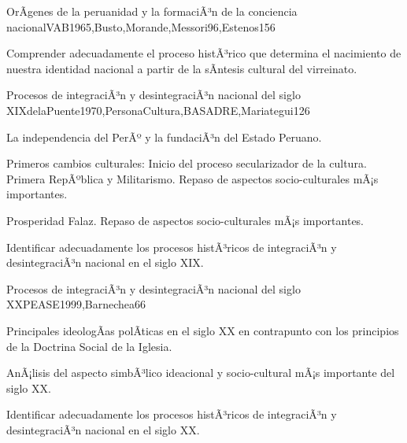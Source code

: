 \begin{syllabus}
\begin{unit}{OrÃ­genes de la peruanidad y la formaciÃ³n de la conciencia nacional}{VAB1965,Busto,Morande,Messori96,Estenos}{15}{6}
\begin{topics}
\end{topics}
\begin{unitgoals}
	\item Comprender adecuadamente el proceso histÃ³rico que determina el nacimiento de nuestra identidad nacional a partir de la sÃ­ntesis cultural del virreinato.
\end{unitgoals}
\end{unit}

\begin{unit}{Procesos de integraciÃ³n y desintegraciÃ³n nacional del siglo XIX}{delaPuente1970,PersonaCultura,BASADRE,Mariategui}{12}{6}
\begin{topics}
	\item La independencia del PerÃº y la fundaciÃ³n del Estado Peruano.
	\item Primeros cambios culturales: Inicio del proceso secularizador de la cultura. Primera RepÃºblica y Militarismo. Repaso de  aspectos socio-culturales mÃ¡s importantes.
	\item Prosperidad Falaz.  Repaso de  aspectos socio-culturales mÃ¡s importantes. 
\end{topics}
\begin{unitgoals}
	\item Identificar adecuadamente los procesos histÃ³ricos de integraciÃ³n y desintegraciÃ³n nacional en el siglo XIX.
\end{unitgoals}
\end{unit}

\begin{unit}{Procesos de integraciÃ³n y desintegraciÃ³n nacional del siglo XX}{PEASE1999,Barnechea}{6}{6}
\begin{topics}
	\item Principales ideologÃ­as polÃ­ticas en el siglo XX en contrapunto con los principios de la Doctrina Social de la Iglesia.
	\item AnÃ¡lisis del aspecto simbÃ³lico ideacional y socio-cultural mÃ¡s importante del siglo XX. 

\end{topics}
\begin{unitgoals}
	\item Identificar adecuadamente los procesos histÃ³ricos de integraciÃ³n y desintegraciÃ³n nacional en el siglo XX. 
\end{unitgoals}
\end{unit}


\end{syllabus}
